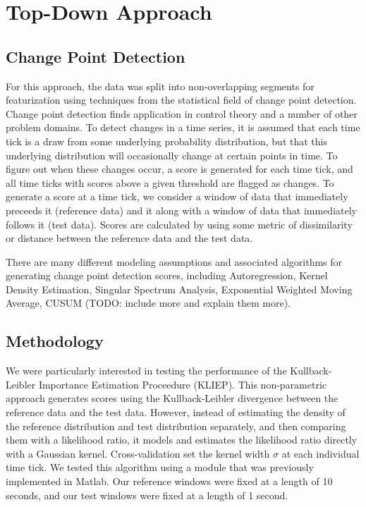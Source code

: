\chapter{Top-Down Approach}
\section{Change Point Detection}
For this approach, the data was split into non-overlapping segments for
featurization using techniques from the statistical field of change point detection.
Change point detection finds application in control theory and a number of other
problem domains. To detect changes in a time series, it is assumed that each
time tick is a draw from some underlying probability distribution,
but that this underlying distribution will occasionally change at certain 
points in time. To figure out when these
changes occur, a score is generated for each time tick, and all time ticks with
scores above a given threshold are flagged as changes. To generate a score at
a time tick, we consider a window of data that immediately preceeds it
(reference data) and it along with a window of data that immediately follows it (test data).
Scores are calculated by using some metric of dissimilarity or distance
between the reference data and the test data.

There are many different modeling assumptions and associated algorithms
for generating change point detection scores,
including Autoregression, Kernel Density Estimation, Singular Spectrum
Analysis, Exponential Weighted Moving Average, CUSUM
(TODO: include more and explain them more).

\section{Methodology}
We were particularly interested in testing the performance of the
Kullback-Leibler Importance Estimation Proceedure (KLIEP).
This non-parametric approach generates scores using the Kullback-Leibler
divergence between the reference data and the test data. However, instead of
estimating the density of the reference distribution and test distribution
separately, and then comparing them with a likelihood ratio, it models and
estimates the likelihood ratio directly with a Gaussian kernel. Cross-validation 
set the kernel width $\sigma$ at each individual time tick.
We tested this algorithm using a module that was previously implemented in Matlab.
Our reference windows were fixed at a length of 10 seconds, and our test
windows were fixed at a length of 1 second.


